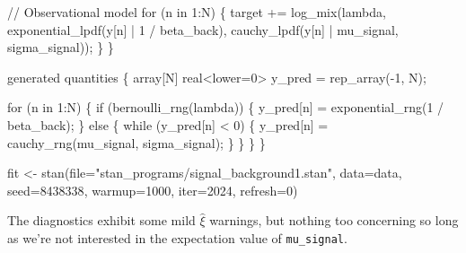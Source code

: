 \documentclass[
  letterpaper,
  DIV=11,
  numbers=noendperiod]{scrartcl}
\newenvironment{Shaded}{\begin{snugshade}}{\end{snugshade}}
\newcommand{\AttributeTok}[1]{\textcolor[rgb]{0.40,0.45,0.13}{#1}}
\newcommand{\CommentTok}[1]{\textcolor[rgb]{0.37,0.37,0.37}{#1}}
\newcommand{\ControlFlowTok}[1]{\textcolor[rgb]{0.00,0.23,0.31}{#1}}
\newcommand{\DataTypeTok}[1]{\textcolor[rgb]{0.68,0.00,0.00}{#1}}
\newcommand{\DecValTok}[1]{\textcolor[rgb]{0.68,0.00,0.00}{#1}}
\newcommand{\FunctionTok}[1]{\textcolor[rgb]{0.28,0.35,0.67}{#1}}
\newcommand{\KeywordTok}[1]{\textcolor[rgb]{0.00,0.23,0.31}{#1}}
\newcommand{\NormalTok}[1]{\textcolor[rgb]{0.00,0.23,0.31}{#1}}
\newcommand{\OtherTok}[1]{\textcolor[rgb]{0.00,0.23,0.31}{#1}}
\newcommand{\SpecialCharTok}[1]{\textcolor[rgb]{0.37,0.37,0.37}{#1}}
\newcommand{\StringTok}[1]{\textcolor[rgb]{0.13,0.47,0.30}{#1}}
\begin{document}
\begin{codelisting}
\begin{Shaded}
\begin{Highlighting}[]
  \CommentTok{// Observational model}
  \ControlFlowTok{for}\NormalTok{ (n }\ControlFlowTok{in} \DecValTok{1}\NormalTok{:N) \{}
    \KeywordTok{target +=}\NormalTok{ log\_mix(lambda,}
\NormalTok{                      exponential\_lpdf(y[n] | }\DecValTok{1}\NormalTok{ / beta\_back),}
\NormalTok{                      cauchy\_lpdf(y[n] | mu\_signal, sigma\_signal));}
\NormalTok{  \}}
\NormalTok{\}}

\KeywordTok{generated quantities}\NormalTok{ \{}
  \DataTypeTok{array}\NormalTok{[N] }\DataTypeTok{real}\NormalTok{\textless{}}\KeywordTok{lower}\NormalTok{=}\DecValTok{0}\NormalTok{\textgreater{} y\_pred = rep\_array({-}}\DecValTok{1}\NormalTok{, N);}

  \ControlFlowTok{for}\NormalTok{ (n }\ControlFlowTok{in} \DecValTok{1}\NormalTok{:N) \{}
    \ControlFlowTok{if}\NormalTok{ (bernoulli\_rng(lambda)) \{}
\NormalTok{      y\_pred[n] = exponential\_rng(}\DecValTok{1}\NormalTok{ / beta\_back);}
\NormalTok{    \} }\ControlFlowTok{else}\NormalTok{ \{}
      \ControlFlowTok{while}\NormalTok{ (y\_pred[n] \textless{} }\DecValTok{0}\NormalTok{) \{}
\NormalTok{        y\_pred[n] = cauchy\_rng(mu\_signal, sigma\_signal);}
\NormalTok{      \}}
\NormalTok{    \}}
\NormalTok{  \}}
\NormalTok{\}}
\end{Highlighting}
\end{Shaded}

\end{codelisting}

\begin{Shaded}
\begin{Highlighting}[]
\NormalTok{fit }\OtherTok{\textless{}{-}} \FunctionTok{stan}\NormalTok{(}\AttributeTok{file=}\StringTok{"stan\_programs/signal\_background1.stan"}\NormalTok{,}
            \AttributeTok{data=}\NormalTok{data, }\AttributeTok{seed=}\DecValTok{8438338}\NormalTok{,}
            \AttributeTok{warmup=}\DecValTok{1000}\NormalTok{, }\AttributeTok{iter=}\DecValTok{2024}\NormalTok{, }\AttributeTok{refresh=}\DecValTok{0}\NormalTok{)}
\end{Highlighting}
\end{Shaded}

The diagnostics exhibit some mild \(\hat{\xi}\) warnings, but nothing
too concerning so long as we're not interested in the expectation value
of \texttt{mu\_signal}.

\begin{Shaded}
\end{Shaded}
\end{document}
